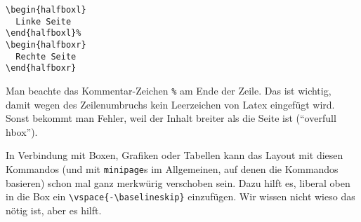 \documentclass{panikzettel}
\begin{document}
\begin{minipage}[t]{0.25\textwidth}
  \vspace{-\baselineskip}
\begin{lstlisting}
\begin{halfboxl}
  Linke Seite
\end{halfboxl}%
\begin{halfboxr}
  Rechte Seite
\end{halfboxr}
\end{lstlisting}
\end{minipage}\hfil%
\begin{minipage}[t]{0.7\textwidth}
  Man beachte das Kommentar-Zeichen \texttt{\%} am Ende der Zeile.
  Das ist wichtig, damit wegen des Zeilenumbruchs kein Leerzeichen von Latex eingefügt wird.
  Sonst bekommt man Fehler, weil der Inhalt breiter als die Seite ist (``overfull hbox'').
\end{minipage}

In Verbindung mit Boxen, Grafiken oder Tabellen kann das Layout mit diesen Kommandos (und mit \texttt{minipage}s im Allgemeinen, auf denen die Kommandos basieren) schon mal ganz merkwürig verschoben sein.
Dazu hilft es, liberal oben in die Box ein \texttt{\textbackslash{}vspace\{-\textbackslash{}baselineskip\}} einzufügen.
Wir wissen nicht wieso das nötig ist, aber es hilft.
\end{document}
